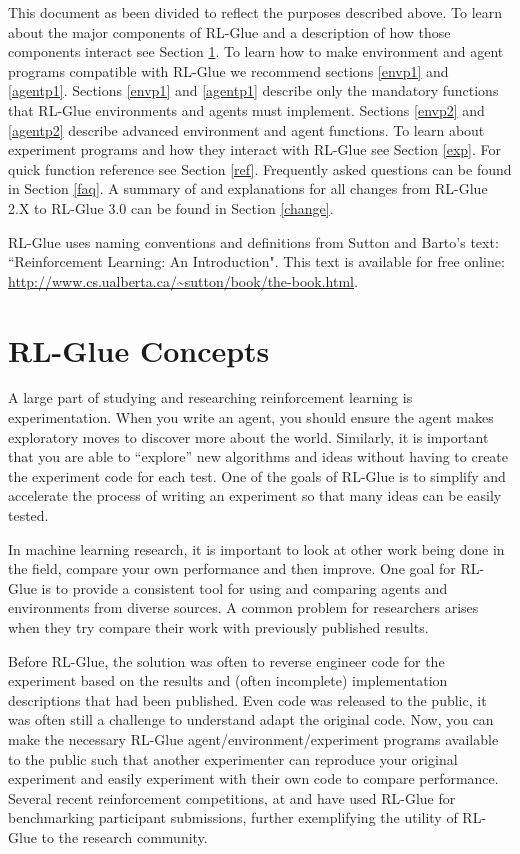 \documentclass[11pt]{article}
\begin{document}
This document as been divided to reflect the purposes described above. To learn about the major components of RL-Glue and a description of how those components interact see Section \ref{RL-Glue}. To learn how to make environment and agent programs compatible with RL-Glue we recommend sections \ref{envp1} and \ref{agentp1}. Sections \ref{envp1} and \ref{agentp1} describe only the mandatory functions that RL-Glue environments and agents must implement. Sections \ref{envp2} and \ref{agentp2} describe advanced environment and agent functions. To learn about experiment programs and how they interact with RL-Glue see Section \ref{exp}. For quick function reference see Section \ref{ref}. Frequently asked questions can be found in Section \ref{faq}. A summary of and explanations for all changes from RL-Glue 2.X to RL-Glue 3.0 can be found in Section \ref{change}.

RL-Glue uses naming conventions and definitions from Sutton and Barto's text: ``Reinforcement Learning: An Introduction".  This text is available for free online: \url{http://www.cs.ualberta.ca/~sutton/book/the-book.html}.
 
 
\section{RL-Glue Concepts}
\label{RL-Glue}
A large part of studying and researching reinforcement learning is experimentation. When you write an agent, you should ensure the agent makes exploratory moves to discover more about the world. Similarly, it is important that you are able to ``explore'' new algorithms and ideas without having to create the experiment code for each test. One of the goals of RL-Glue is to simplify and accelerate the process of writing an experiment so that many ideas can be easily tested. 


In machine learning research, it is important to look at other work being done in the field, compare your own performance and then improve. One goal for RL-Glue is to provide a consistent tool for using and comparing agents and environments from diverse sources. A common problem for researchers arises when they try compare their work with previously published results.

Before RL-Glue, the solution was often to reverse engineer code for the experiment based on the results and (often incomplete) implementation descriptions that had been published.  Even code was released to the public, it was often still a challenge to understand adapt the original code. Now, you can make the necessary RL-Glue agent/environment/experiment programs  available to the public such that another experimenter can reproduce your original experiment and easily experiment with their own code to compare performance.  Several recent reinforcement competitions, at  and  have used RL-Glue for benchmarking participant submissions, further exemplifying the utility of RL-Glue to the research community.
 
\end{document}
